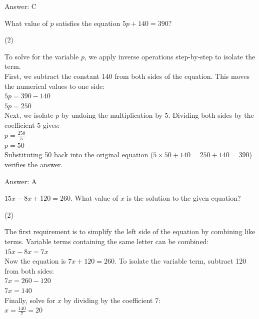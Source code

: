 \documentclass[11pt,paper=a4,answers]{exam}
\begin{document}
\begin{questions}
\begin{solution}
\vspace{20pt}
Answer: \colorbox{yellow!100}{C}
\end{solution}

\question
What value of $p$ satisfies the equation $5p + 140 = 390$?
\begin{tasks}(2)
\end{tasks}

\begin{solution}
To solve for the variable $p$, we apply inverse operations step-by-step to isolate the term. 
\\[10pt]
First, we subtract the constant 140 from both sides of the equation. This moves the numerical values to one side:
\\[10pt]
$5p = 390 - 140$ \\
$5p = 250$ 
\\[10pt]
Next, we isolate $p$ by undoing the multiplication by 5. Dividing both sides by the coefficient 5 gives:
\\[10pt]
$p = \frac{250}{5}$ \\
$p = 50$ 
\\[10pt]
Substituting 50 back into the original equation ($5 \times 50 + 140 = 250 + 140 = 390$) verifies the answer.

\vspace{20pt}
Answer: \colorbox{yellow!100}{A}
\end{solution}

\question
$15x - 8x + 120 = 260$. What value of $x$ is the solution to the given equation?
\begin{tasks}(2)
\end{tasks}

\begin{solution}
The first requirement is to simplify the left side of the equation by combining like terms. Variable terms containing the same letter can be combined:
\\[10pt]
$15x - 8x = 7x$ 
\\[10pt]
Now the equation is $7x + 120 = 260$. To isolate the variable term, subtract 120 from both sides:
\\[10pt]
$7x = 260 - 120$ \\
$7x = 140$ 
\\[10pt]
Finally, solve for $x$ by dividing by the coefficient 7:
\\[10pt]
$x = \frac{140}{7} = 20$


\end{solution}
\end{questions}
\end{document}
